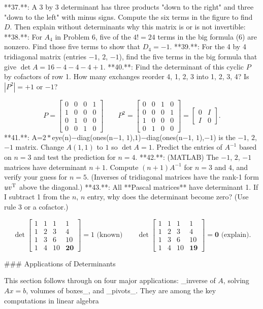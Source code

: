 

**37.**: A 3 by 3 determinant has three products "down to the right" and three "down to the left" with minus signs. Compute the six terms in the figure to find \(D\). Then explain without determinants why this matrix is or is not invertible:
**38.**: For \(A_{4}\) in Problem 6, five of the \(4!=24\) terms in the big formula (6) are nonzero. Find those five terms to show that \(D_{4}=-1\).
**39.**: For the 4 by 4 tridiagonal matrix (entries \(-1\), \(2\), \(-1\)), find the five terms in the big formula that give \(\det A=16-4-4-4+1\).
**40.**: Find the determinant of this cyclic \(P\) by cofactors of row 1. How many exchanges reorder 4, 1, 2, 3 into 1, 2, 3, 4? Is \(|P^{2}|=+1\) or \(-1\)?

\[P=\begin{bmatrix}0&0&0&1\\ 1&0&0&0\\ 0&1&0&0\\ 0&0&1&0\end{bmatrix}\qquad P^{2}=\begin{bmatrix}0&0&1&0\\ 0&0&0&1\\ 1&0&0&0\\ 0&1&0&0\end{bmatrix}=\begin{bmatrix}0&I\\ I&0\end{bmatrix}.\]
**41.**: A=\(2*\)eye(n)\(-\)diag(ones(n\(-1\), \(1\)),\(1\))\(-\)diag(ones(n\(-1\), \(1\)),\(-1\)) is the \(-1\), \(2\), \(-1\) matrix. Change \(A(1,1)\) to \(1\) so \(\det A=1\). Predict the entries of \(A^{-1}\) based on \(n=3\) and test the prediction for \(n=4\).
**42.**: (MATLAB) The \(-1\), \(2\), \(-1\) matrices have determinant \(n+1\). Compute \((n+1)A^{-1}\) for \(n=3\) and \(4\), and verify your guess for \(n=5\). (Inverses of tridiagonal matrices have the rank-1 form \(uv^{\rm T}\) above the diagonal.)
**43.**: All **Pascal matrices** have determinant 1. If I subtract 1 from the \(n\), \(n\) entry, why does the determinant become zero? (Use rule 3 or a cofactor.)

\[\det\begin{bmatrix}1&1&1&1\\ 1&2&3&4\\ 1&3&6&10\\ 1&4&10&\mathbf{20}\end{bmatrix}=1\text{ (known)}\qquad\det\begin{bmatrix}1&1&1&1\\ 1&2&3&4\\ 1&3&6&10\\ 1&4&10&\mathbf{19}\end{bmatrix}=\mathbf{0}\text{ (explain)}.\]

### Applications of Determinants

This section follows through on four major applications: _inverse of \(A\), solving \(Ax=b\), volumes of boxes_, and _pivots_. They are among the key computations in linear algebra